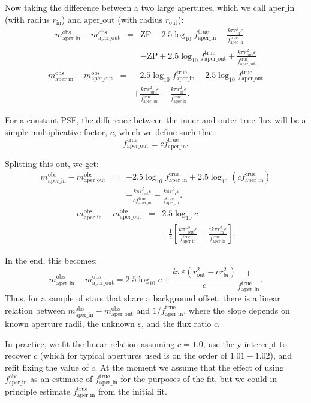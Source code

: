 \documentclass{article}
\newcommand{\obs}{\mathrm{obs}}
\newcommand{\aperin}{\mathrm{aper\_in}}
\newcommand{\aperout}{\mathrm{aper\_out}}
\newcommand{\true}{\mathrm{true}}
\newcommand{\bkgoffset}{\varepsilon}
\newcommand{\ZP}{\mathrm{ZP}}
\begin{document}
Now taking the difference between a two large apertures, which we call
$\aperin$ (with radius $r_{\mathrm{in}}$) and $\aperout$ (with radius
$r_{\mathrm{out}}$):
%
\begin{eqnarray}
  m_\aperin^\obs - m_\aperout^\obs &=& \ZP - 2.5\log_{10}f_\aperin^\true -
  \frac{k \pi r_{\mathrm{in}}^2 \bkgoffset}{f_\aperin^{\true}}\\
  &&- \ZP +
  2.5\log_{10}f_\aperout^\true + \frac{k \pi r_{\mathrm{out}}^2
    \bkgoffset}{f_\aperout^{\true}}
\end{eqnarray}
%
\begin{eqnarray}
  m_\aperin^\obs - m_\aperout^\obs &=& -2.5\log_{10}f_\aperin^\true +
  2.5\log_{10}f_\aperout^\true\\
  && + \frac{k \pi r_{\mathrm{out}}^2 \bkgoffset}{f_\aperout^\true} - \frac{k \pi
    r_{\mathrm{in}}^2 \bkgoffset}{f_\aperin^\true}.
\end{eqnarray}

For a constant PSF, the difference between the inner and outer true flux will
be a simple multiplicative factor, $c$, which we define such that:
\begin{equation}
  f_\aperout^\true \equiv c f_\aperin^\true.
\end{equation}

Splitting this out, we get:
%
\begin{eqnarray}
  m_\aperin^\obs - m_\aperout^\obs &=& -2.5\log_{10}f_\aperin^\true +
  2.5\log_{10}(c f_\aperin^\true)\\
  && + \frac{k \pi r_{\mathrm{out}}^2 \bkgoffset}{c f_\aperin^\true} - \frac{k
    \pi r_{\mathrm{in}}^2 \bkgoffset}{f_\aperin^\true}.
\end{eqnarray}
%
\begin{eqnarray}
  m_\aperin^\obs - m_\aperout^\obs &=& 2.5\log_{10}c\\
  && + \frac{1}{c}\left [ \frac{k \pi r_{\mathrm{out}}^2
      \bkgoffset}{f_\aperin^\true} - \frac{c k \pi r_{\mathrm{in}}^2
      \bkgoffset}{f_\aperin^\true} \right ].
\end{eqnarray}

In the end, this becomes:
\begin{equation}
  m_\aperin^\obs - m_\aperout^\obs = 2.5\log_{10}c + \frac{k \pi \bkgoffset
    (r_{\mathrm{out}}^2 - c r_{\mathrm{in}}^2)}{c} \frac{1}{f_\aperin^\true}.
\end{equation}
%
Thus, for a sample of stars that share a background offset, there is a linear
relation between $m_\aperin^\obs - m_\aperout^\obs$ and $1/f_\aperin^\true$,
where the slope depends on known aperture radii, the unknown $\bkgoffset$, and
the flux ratio $c$.

In practice, we fit the linear relation assuming $c=1.0$, use the y-intercept
to recover $c$ (which for typical apertures used is on the order of $1.01 -
1.02$), and refit fixing the value of $c$.  At the moment we assume that the
effect of using $f_\aperin^\obs$ as an estimate of $f_\aperin^\true$ for the
purposes of the fit, but we could in principle estimate $f_\aperin^\true$ from
the initial fit.
\end{document}

